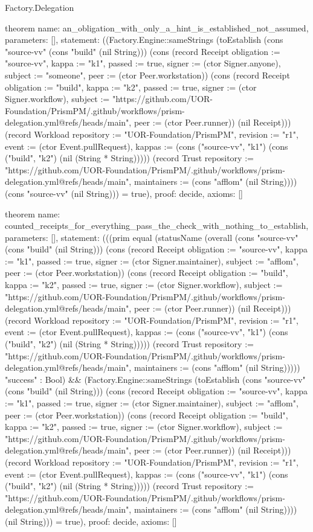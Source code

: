 \begin{lexlean}{Factory.Delegation}
\begin{semanticmodule}
theorem{
  name: an_obligation_with_only_a_hint_is_established_not_assumed,
  parameters: [],
  statement: ((Factory.Engine::sameStrings (toEstablish (cons "source-vv" (cons "build" (nil String))) (cons (record Receipt {obligation := "source-vv", kappa := "k1", passed := true, signer := (ctor Signer.anyone), subject := "someone", peer := (ctor Peer.workstation)}) (cons (record Receipt {obligation := "build", kappa := "k2", passed := true, signer := (ctor Signer.workflow), subject := "https://github.com/UOR-Foundation/PrismPM/.github/workflows/prism-delegation.yml@refs/heads/main", peer := (ctor Peer.runner)}) (nil Receipt))) (record Workload {repository := "UOR-Foundation/PrismPM", revision := "r1", event := (ctor Event.pullRequest), kappas := (cons ("source-vv", "k1") (cons ("build", "k2") (nil (String * String))))}) (record Trust {repository := "https://github.com/UOR-Foundation/PrismPM/.github/workflows/prism-delegation.yml@refs/heads/main", maintainers := (cons "afflom" (nil String))})) (cons "source-vv" (nil String))) = true),
  proof: decide{},
  axioms: []
}

theorem{
  name: counted_receipts_for_everything_pass_the_check_with_nothing_to_establish,
  parameters: [],
  statement: (((prim equal (statusName (overall (cons "source-vv" (cons "build" (nil String))) (cons (record Receipt {obligation := "source-vv", kappa := "k1", passed := true, signer := (ctor Signer.maintainer), subject := "afflom", peer := (ctor Peer.workstation)}) (cons (record Receipt {obligation := "build", kappa := "k2", passed := true, signer := (ctor Signer.workflow), subject := "https://github.com/UOR-Foundation/PrismPM/.github/workflows/prism-delegation.yml@refs/heads/main", peer := (ctor Peer.runner)}) (nil Receipt))) (record Workload {repository := "UOR-Foundation/PrismPM", revision := "r1", event := (ctor Event.pullRequest), kappas := (cons ("source-vv", "k1") (cons ("build", "k2") (nil (String * String))))}) (record Trust {repository := "https://github.com/UOR-Foundation/PrismPM/.github/workflows/prism-delegation.yml@refs/heads/main", maintainers := (cons "afflom" (nil String))}))) "success" : Bool) && (Factory.Engine::sameStrings (toEstablish (cons "source-vv" (cons "build" (nil String))) (cons (record Receipt {obligation := "source-vv", kappa := "k1", passed := true, signer := (ctor Signer.maintainer), subject := "afflom", peer := (ctor Peer.workstation)}) (cons (record Receipt {obligation := "build", kappa := "k2", passed := true, signer := (ctor Signer.workflow), subject := "https://github.com/UOR-Foundation/PrismPM/.github/workflows/prism-delegation.yml@refs/heads/main", peer := (ctor Peer.runner)}) (nil Receipt))) (record Workload {repository := "UOR-Foundation/PrismPM", revision := "r1", event := (ctor Event.pullRequest), kappas := (cons ("source-vv", "k1") (cons ("build", "k2") (nil (String * String))))}) (record Trust {repository := "https://github.com/UOR-Foundation/PrismPM/.github/workflows/prism-delegation.yml@refs/heads/main", maintainers := (cons "afflom" (nil String))})) (nil String))) = true),
  proof: decide{},
  axioms: []
}


\end{semanticmodule}
\end{lexlean}
